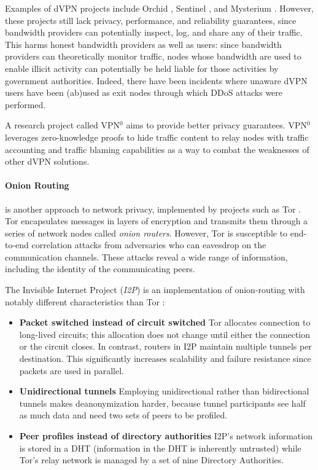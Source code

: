 Examples of dVPN projects include Orchid \cite{orchid}, Sentinel \cite{sentinel}, and Mysterium \cite{mysterium}. However, these projects still lack privacy, performance, and reliability guarantees, since bandwidth providers can potentially inspect, log, and share any of their traffic. This harms honest bandwidth providers as well as users: since bandwidth providers can theoretically monitor traffic, nodes whose bandwidth are used to enable illicit activity can potentially be held liable for those activities by government authorities. Indeed, there have been incidents where unaware dVPN users have been (ab)used as exit nodes through which DDoS attacks
were performed.

A research project called VPN$^0$ \cite{vpn0} aims to provide better privacy guarantees. VPN$^0$ leverages zero-knowledge proofs to hide traffic content to relay nodes with traffic accounting and traffic blaming capabilities as a way to combat the weaknesses of other dVPN solutions.

\paragraph{Onion Routing} is another approach to network privacy, implemented by projects such as Tor \cite{tor}. Tor encapsulates messages in layers of encryption and transmits them through a series of network nodes called \textit{onion routers}. However, Tor is susceptible to end-to-end correlation attacks from adversaries who can eavesdrop on the communication channels. These attacks reveal a wide range of information, including the identity of the communicating peers.

The Invisible Internet Project (\textit{I2P}) is an implementation of onion-routing with notably different characteristics than Tor \cite{i2p}:

\begin{itemize}

    \item \textbf{Packet switched instead of circuit switched}
          Tor allocates connection to long-lived circuits; this allocation does not change until either the connection or the circuit closes. In contrast, routers in I2P maintain multiple tunnels per destination. This significantly increases scalability and failure resistance since packets are used in parallel.

    \item \textbf{Unidirectional tunnels}
          Employing unidirectional rather than bidirectional tunnels makes deanonymization harder, because tunnel participants see half as much data and need two sets of peers to be profiled.

    \item \textbf{Peer profiles instead of directory authorities}
          I2P’s network information is stored in a DHT (information in the DHT is inherently untrusted) while Tor’s relay network is managed by a set of nine Directory Authorities.
\end{itemize}

